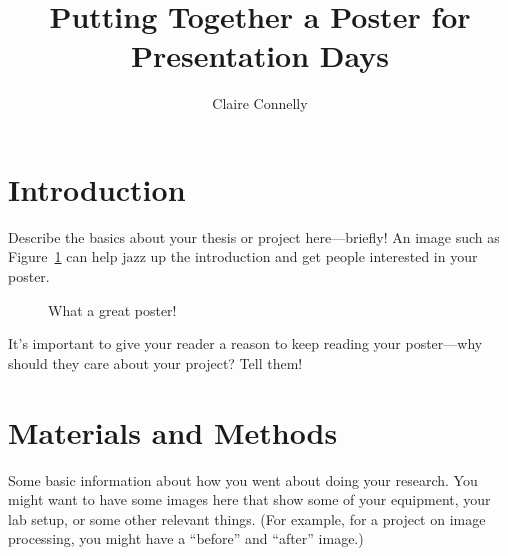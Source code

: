 \documentclass{hmcthesisposter}
\author{Claire Connelly}
\title{Putting Together a Poster for Presentation Days}
\begin{document}
\begin{poster}

\section{Introduction}

Describe the basics about your thesis or project here---briefly!  An
image such as Figure~\ref{fig:our-poster} can help jazz up the
introduction and get people interested in your poster.

\begin{figure}
\begin{center}
\caption{What a great poster!}%
\label{fig:our-poster}
\end{center}
\end{figure}

It's important to give your reader a reason to keep reading your
poster---why should they care about your project?  Tell them!


\section{Materials and Methods}%

Some basic information about how you went about doing your
research.  You might want to have some images here that show some of
your equipment, your lab setup, or some other relevant things.  (For
example, for a project on image processing, you might have a
``before'' and ``after'' image.)


\end{poster}
\end{document}
